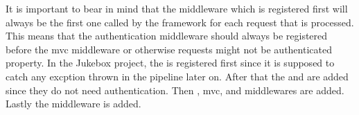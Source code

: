 It is important to bear in mind that the middleware which is registered first will always be the first one called by the framework for each request that is processed. This means that the authentication middleware should always be registered before the \gls{mvc} middleware or otherwise requests might not be authenticated property. In the Jukebox project, the  is registered first since it is supposed to catch any excption thrown in the pipeline later on. After that the  and  are added since they do not need authentication. Then , \gls{mvc}, and  middlewares are added. Lastly the  middleware is added.



